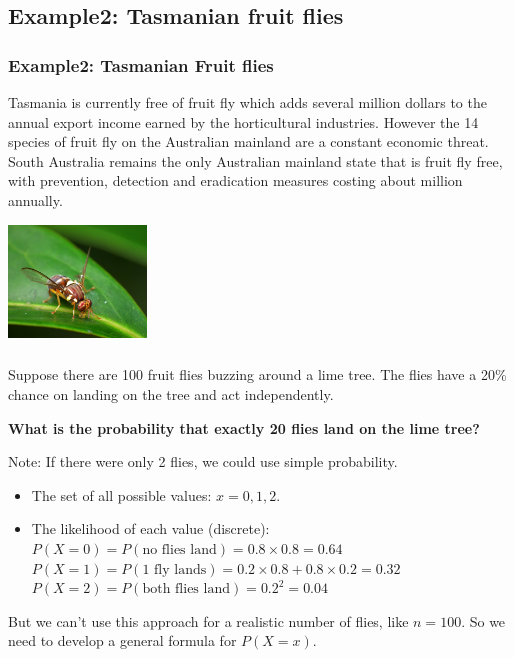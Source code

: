 \documentclass[t,xcolor=pdftex,dvipsnames,table]{beamer}
\begin{document}
\subsection{Example2: Tasmanian fruit flies}
\begin{frame}\frametitle{Example2: Tasmanian Fruit flies}

Tasmania is currently free of fruit fly which adds several million dollars to the annual export income earned by the horticultural industries. However the 14 species of fruit fly on the Australian mainland are a constant economic threat. South Australia remains the only Australian mainland state that is fruit fly free, with prevention, detection and eradication measures costing about  million annually. 

\begin{center}
\includegraphics[height=3cm]{../images/Queensland_Fruit_Fly_-_Bactrocera_tryoni.jpg}
\end{center}
\href{http://dpipwe.tas.gov.au/biosecurity/plant-biosecurity/pests-and-diseases/fruit-fly}{}
\href{http://pir.sa.gov.au/biosecurity/fruit\_fly}{}
\end{frame}

\begin{frame}\frametitle{}

Suppose there are 100 fruit flies buzzing around a lime tree. The flies have a 20\% chance on landing on the tree and act independently. 

\vspace{.5cm}
{\bf What is the probability that exactly 20 flies land on the lime tree?}

\vspace{1cm}
{\tiny Note: If there were only 2 flies, we could use simple probability.
\begin{itemize}
\item The set of all possible values: $x=0,1,2$.
\item  The likelihood of each value (discrete): \\
$P(X=0) = P(\mbox{no flies land}) = 0.8 \times 0.8 = 0.64$ \\
$P(X=1) = P(\mbox{1 fly lands}) = 0.2 \times 0.8 +  0.8 \times 0.2 = 0.32$ \\
$P(X=2) = P(\mbox{both flies land}) = 0.2^2  = 0.04$ \\
\end{itemize}

But we can't use this approach for a  realistic number of flies, like $n=100$. So we need to develop a general formula for $P(X=x)$.}
\end{frame}
\end{document}

